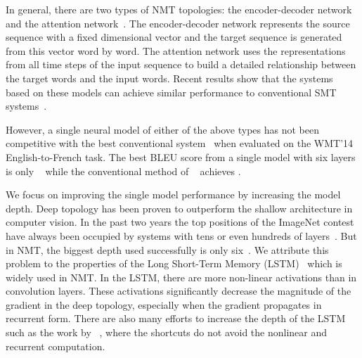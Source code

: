 \documentclass[11pt,letterpaper]{article}
\newcommand{\change}[1]{}
\begin{document}
In general, there are two types of NMT topologies: the encoder-decoder network~\cite{Sutskever-Le-NIPS2014} and the
attention network~\cite{Bahdanau-Bengio-ICLR2015}. The encoder-decoder network represents the source sequence with a fixed
dimensional vector and the target sequence is generated from this vector  word by word. The attention network \mbox{uses}
the representations from all time steps of the input sequence to build a detailed relationship between the target words and the input
words. Recent results show that the systems based on these models can achieve similar performance to conventional SMT
\mbox{systems}~\cite{Luong-Zaremba-ACL2015,Jean-Bengio-ACL2015}.


However,  a single neural model of either of the above types has not been competitive with the best conventional
system~\cite{Durrani-Heafield-WMT2014} when \mbox{evaluated} on the WMT'14 English-to-French task. The best BLEU score from a single
model with six layers is only  ~\cite{Luong-Zaremba-ACL2015} while the conventional method of ~\cite{Durrani-Heafield-WMT2014}
achieves .


We focus on improving the single model performance by increasing the model depth. Deep topology has been proven to outperform the shallow
architecture in computer vision. In the past two years  the top positions of the ImageNet contest have always been occupied
by systems with \change{was:more than} tens or even hundreds of layers~\cite{Szegedy-Rabinovich-CVPR2015,He-Sun-ARXIV2015}. But in
NMT, the biggest depth used successfully is \mbox{only} six~\cite{Luong-Zaremba-ACL2015}. We attribute this problem to the properties of
the Long Short-Term Memory (\mbox{LSTM})~\cite{Hochreiter-Schmidhuber-NC1997} which is widely used in NMT. In the LSTM,
there are more non-linear activations than in convolution layers. These activations significantly decrease the  magnitude of the
gradient in the deep topology, especially when the gradient propagates in recurrent form. There are also many efforts to increase the depth of
the LSTM such as the work by ~, where the shortcuts do not avoid the nonlinear and
recurrent computation.
\end{document}
